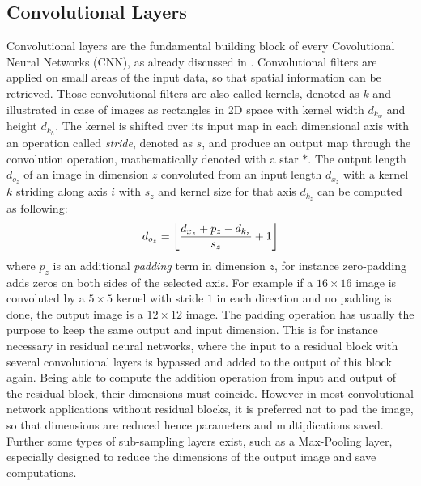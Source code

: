 
\subsection{Convolutional Layers}\label{sec:nn_theory_cnn}
Convolutional layers are the fundamental building block of every Covolutional Neural Networks (CNN), as already discussed in .
Convolutional filters are applied on small areas of the input data, so that spatial information can be retrieved.
Those convolutional filters are also called kernels, denoted as $k$ and illustrated in case of images as rectangles in 2D space with kernel width $d_{k_w}$ and height $d_{k_h}$.
The kernel is shifted over its input map in each dimensional axis with an operation called \emph{stride}, denoted as $s$, and produce an output map through the convolution operation, mathematically denoted with a star $*$.
The output length $d_{o_z}$ of an image in dimension $z$ convoluted from an input length $d_{x_z}$ with a kernel $k$ striding along axis $i$ with $s_z$ and kernel size for that axis $d_{k_z}$ can be computed as following:
\begin{equation}\label{eq:nn_theory_cnn_}
  d_{o_z} = \floor*{\frac{d_{x_z} + p_z - d_{k_z}}{s_z} + 1}
\end{equation}
where $p_z$ is an additional \emph{padding} term in dimension $z$, for instance zero-padding adds zeros on both sides of the selected axis.
For example if a $16 \times 16$ image is convoluted by a $5 \times 5$ kernel with stride $1$ in each direction and no padding is done, the output image is a $12 \times 12$ image.
The padding operation has usually the purpose to keep the same output and input dimension.
This is for instance necessary in residual neural networks, where the input to a residual block with several convolutional layers is bypassed and added to the output of this block again.
Being able to compute the addition operation from input and output of the residual block, their dimensions must coincide.
However in most convolutional network applications without residual blocks, it is preferred not to pad the image, so that dimensions are reduced hence parameters and multiplications saved.
Further some types of sub-sampling layers exist, such as a Max-Pooling layer, especially designed to reduce the dimensions of the output image and save computations.

